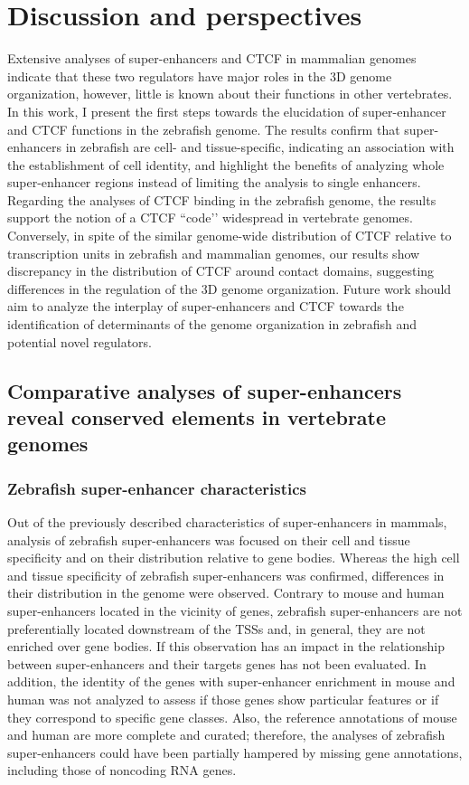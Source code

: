 \chapter{Discussion and perspectives}

Extensive analyses of super-enhancers and CTCF in mammalian genomes indicate that these two regulators have major roles in the 3D genome organization, however, little is known about their functions in other vertebrates. In this work, I present the first steps towards the elucidation of super-enhancer and CTCF functions in the zebrafish genome. The results confirm that super-enhancers in zebrafish are cell- and tissue-specific, indicating an association with the establishment of cell identity, and highlight the benefits of analyzing whole super-enhancer regions instead of limiting the analysis to single enhancers. Regarding the analyses of CTCF binding in the zebrafish genome, the results support the notion of a CTCF ``code’’ widespread in vertebrate genomes. Conversely, in spite of the similar genome-wide distribution of CTCF relative to transcription units in zebrafish and mammalian genomes, our results show discrepancy in the distribution of CTCF around contact domains, suggesting differences in the regulation of the 3D genome organization. Future work should aim to analyze the interplay of super-enhancers and CTCF towards the identification of determinants of the genome organization in zebrafish and potential novel regulators.\\

	\section{Comparative analyses of super-enhancers reveal conserved elements in vertebrate genomes}

		\subsection{Zebrafish super-enhancer characteristics}

Out of the previously described characteristics of super-enhancers in mammals, analysis of zebrafish super-enhancers was focused on their cell and tissue specificity and on their distribution relative to gene bodies. Whereas the high cell and tissue specificity of zebrafish super-enhancers was confirmed, differences in their distribution in the genome were observed. Contrary to mouse and human super-enhancers located in the vicinity of genes, zebrafish super-enhancers are not preferentially located downstream of the TSSs and, in general, they are not enriched over gene bodies. If this observation has an impact in the relationship between super-enhancers and their targets genes has not been evaluated. In addition, the identity of the genes with super-enhancer enrichment in mouse and human was not analyzed to assess if those genes show particular features or if they correspond to specific gene classes. Also, the reference annotations of mouse and human are more complete and curated; therefore, the analyses of zebrafish super-enhancers could have been partially hampered by missing gene annotations, including those of noncoding RNA genes.\\

